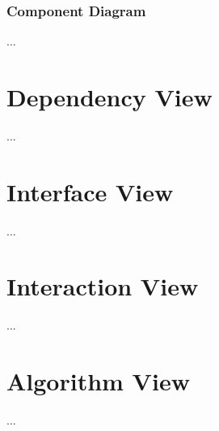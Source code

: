 		\subsubsection{Component Diagram}
		...



\section{Dependency View}
...

\section{Interface View}
...

\section{Interaction View}
...

\section{Algorithm View}
...






